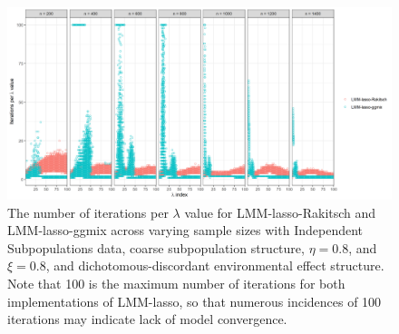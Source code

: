 \begin{figure}[H]
    \centering
    \includegraphics[width=\textwidth]{figures/niter_perLambda_point.png}
    \caption{The number of iterations per $\lambda$ value for LMM-lasso-Rakitsch and LMM-lasso-ggmix across varying sample sizes with Independent Subpopulations data, coarse subpopulation structure, $\eta = 0.8$, and $\xi = 0.8$, and dichotomous-discordant environmental effect structure. Note that 100 is the maximum number of iterations for both implementations of LMM-lasso, so that numerous incidences of 100 iterations may indicate lack of model convergence.}
    \label{fig:niter}
\end{figure}
